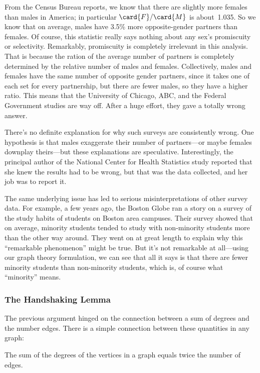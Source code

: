 From the Census Bureau reports, we know that there are slightly more
females than males in America; in particular $\card{F} / \card{M}$ is
about~1.035.  So we know that on average, males have 3.5\% more
opposite-gender partners than females.  Of course, this statistic
really says nothing about
any sex's promiscuity or selectivity.  Remarkably, promiscuity is
completely irrelevant in this analysis.  That is because the ration of
the average number of partners is completely determined by the
relative number of males and females.  Collectively, males and
females have the same number of opposite gender partners, since it
takes one of each set for every partnership, but there are fewer
males, so they have a higher ratio.  This means that the University of
Chicago, ABC, and the Federal Government studies are way off.  After a
huge effort, they gave a totally wrong answer.

There's no definite explanation for why such surveys are consistently
wrong.  One hypothesis is that males exaggerate their number of
partners---or maybe females downplay theirs---but these explanations
are speculative.  Interestingly, the principal author of the National
Center for Health Statistics study reported that she knew the results
had to be wrong, but that was the data collected, and her job was to
report it.

The same underlying issue has led to serious misinterpretations of
other survey data.  For example, a few years ago, the Boston Globe ran
a story on a survey of the study habits of students on Boston area
campuses.  Their survey showed that on average, minority students
tended to study with non-minority students more than the other way
around.  They went on at great length to explain why this ``remarkable
phenomenon'' might be true.  But it's not remarkable at all---using
our graph theory formulation, we can see that all it says is that
there are fewer minority students than non-minority students, which
is, of course what ``minority'' means.

\subsubsection{The Handshaking Lemma}

The previous argument hinged on the connection between a sum of
degrees and the number edges.  There is a simple connection between
these quantities in any graph:
\begin{lemma}\label{sumedges}
The sum of the degrees of the vertices in a graph equals twice the number of edges.
\end{lemma}

